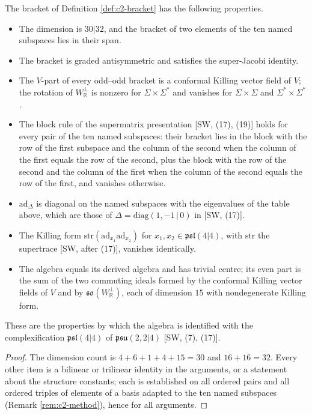 \begin{proposition}
\label{prop:c2-psl}
The bracket of Definition \ref{def:c2-bracket} has the following properties.
\begin{itemize}
\item The dimension is $30|32$, and the bracket of two elements of the ten named subspaces lies in their span.
\item The bracket is graded antisymmetric and satisfies the super-Jacobi identity.
\item The $V$-part of every odd--odd bracket is a conformal Killing vector field of $V$; the rotation of $W_{\mathbb R}^\perp$ is nonzero for $\Sigma\times\Sigma^*$ and vanishes for $\Sigma\times\Sigma$ and $\Sigma^*\times\Sigma^*$.
\item The block rule of the supermatrix presentation [SW, (17), (19)] holds for every pair of the ten named subspaces: their bracket lies in the block with the row of the first subspace and the column of the second when the column of the first equals the row of the second, plus the block with the row of the second and the column of the first when the column of the second equals the row of the first, and vanishes otherwise.
\item $\mathrm{ad}_\Delta$ is diagonal on the named subspaces with the eigenvalues of the table above, which are those of $\Delta=\mathrm{diag}(1,-1\,|\,0)$ in [SW, (17)].
\item The Killing form $\mathrm{str}(\mathrm{ad}_{x_1}\mathrm{ad}_{x_2})$ for $x_1,x_2\in\mathfrak{psl}(4|4)$, with $\mathrm{str}$ the supertrace [SW, after (17)], vanishes identically.
\item The algebra equals its derived algebra and has trivial centre; its even part is the sum of the two commuting ideals formed by the conformal Killing vector fields of $V$ and by $\mathfrak{so}(W_{\mathbb R}^\perp)$, each of dimension $15$ with nondegenerate Killing form.
\end{itemize}
These are the properties by which the algebra is identified with the complexification $\mathfrak{psl}(4|4)$ of $\mathfrak{psu}(2,2|4)$ [SW, (7), (17)].
\end{proposition}

\begin{proof}
The dimension count is $4+6+1+4+15=30$ and $16+16=32$. Every other item is a bilinear or trilinear identity in the arguments, or a statement about the structure constants; each is established on all ordered pairs and all ordered triples of elements of a basis adapted to the ten named subspaces (Remark \ref{rem:c2-method}), hence for all arguments.
\end{proof}

